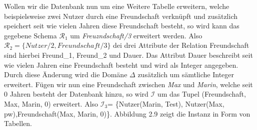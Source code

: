 Wollen wir die Datenbank nun um eine Weitere Tabelle erweitern, welche beispielsweise zwei Nutzer durch eine Freundschaft verknüpft und zusätzlich speichert seit wie vielen Jahren diese Freundschaft besteht, so wird kann das gegebene Schema $\mathcal{R}_1$ um \emph{Freuzndschaft/3} erweitert werden. Also $\mathcal{R}_2=\{Nutzer/2, Freundschaft/3\}$ dei drei Attribute der Relation Freundschaft sind hierbei Freund\_1, Freund\_2 und Dauer. Das Attribut Dauer beschreibt seit wie vielen Jahren eine Freundschaft besteht und wird als Integer angegeben. Durch diese Änderung wird die Domäne ${\Delta}$ zusätzlich um sämtliche Integer erweitert. 
Fügen wir nun eine Freundschaft zwischen \emph{Max} und \emph{Marin}, welche seit 0 Jahren besteht der Datenbank hinzu, so wird  $\mathcal{I}$ um das Tupel (Freundschaft, Max, Marin, 0) erweitert. Also $\mathcal{I}_3$= \{Nutzer(Marin, Test), Nutzer(Max, pw),Freundschaft(Max, Marin, 0)\}. Abbildung 2.9 zeigt die Instanz in Form von Tabellen.


